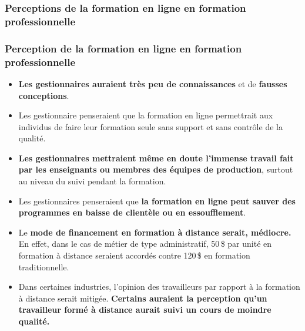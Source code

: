 					\subsubsection{Perceptions de la formation en ligne en formation professionnelle} 
						\begin{frame}[allowframebreaks]
						\frametitle{Perception de la formation en ligne en formation professionnelle}
                        			
                        			\begin{itemize}
                        			\item \textbf{Les gestionnaires auraient très peu de connaissances} et de \textbf{fausses conceptions}. 
                        			\item Les gestionnaire penseraient que la formation en ligne permettrait aux individus de faire leur formation seule sans support et sans contrôle de la qualité. 
                        			\item \textbf{Les gestionnaires mettraient même en doute l’immense travail fait par les enseignants ou membres des équipes de production}, surtout au niveau du suivi pendant la formation.
                        			\item Les gestionnaires penseraient que\textbf{ la formation en ligne peut sauver des programmes en baisse de clientèle ou en essoufflement}. 
                        			\item Le \textbf{mode de financement en formation à distance serait, médiocre.} En effet, dans le cas de métier de type administratif, 50\,\$ par unité en formation à distance seraient accordés contre 120\,\$ en formation traditionnelle. 
                        			\item Dans certaines industries, l’opinion des travailleurs par rapport à la formation à distance serait mitigée. \textbf{Certains auraient la perception qu’un travailleur formé à distance aurait suivi un cours de moindre qualité.}
                        			
						\end{itemize}
						\end{frame}	
						
